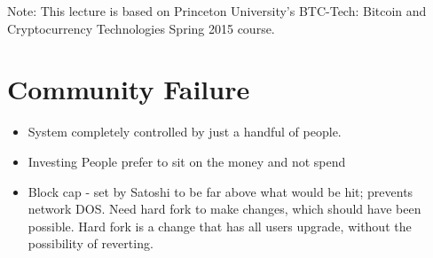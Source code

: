 \documentclass{article}
\begin{document}
\maketitle

Note: This lecture is based on Princeton University's BTC-Tech: Bitcoin and Cryptocurrency Technologies Spring 2015 course.



\section*{Community Failure}
\begin{itemize}
  \item System completely controlled by just a handful of people.
  \item Investing
    \subitem People prefer to sit on the money and not spend
  \item Block cap - set by Satoshi to be far above what would be hit; prevents network DOS.
    \subitem Need hard fork to make changes, which should have been possible.
    \subitem Hard fork is a change that has all users upgrade, without the possibility of reverting.
\end{itemize}
\end{document}
